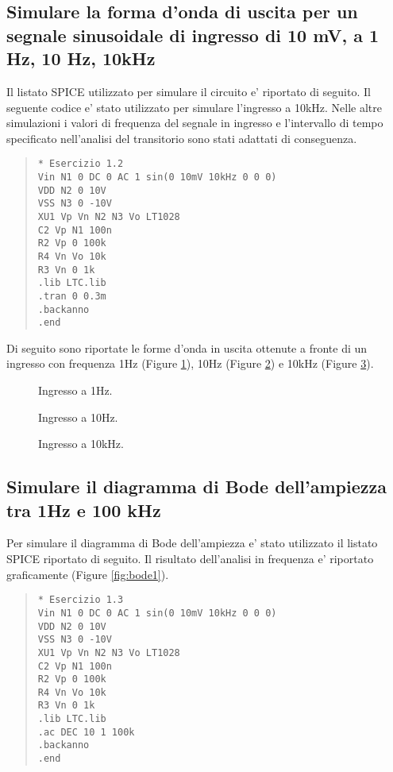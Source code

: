 \documentclass[a4paper,10pt]{article}
\begin{document}
\subsection{Simulare la forma d'onda di uscita per un segnale sinusoidale di ingresso di 10 mV, a 1 Hz, 10 Hz, 10kHz}
Il listato SPICE utilizzato per simulare il circuito e' riportato di seguito. Il seguente codice e' stato utilizzato per simulare l'ingresso a 10kHz. Nelle altre simulazioni i valori di frequenza del segnale in ingresso e l'intervallo di tempo specificato nell'analisi del transitorio sono stati adattati di conseguenza.
\begin{quote}
\begin{verbatim}
* Esercizio 1.2
Vin N1 0 DC 0 AC 1 sin(0 10mV 10kHz 0 0 0)
VDD N2 0 10V
VSS N3 0 -10V
XU1 Vp Vn N2 N3 Vo LT1028
C2 Vp N1 100n
R2 Vp 0 100k
R4 Vn Vo 10k
R3 Vn 0 1k
.lib LTC.lib
.tran 0 0.3m
.backanno
.end
\end{verbatim}
\end{quote}
Di seguito sono riportate le forme d'onda in uscita ottenute a fronte di un ingresso con frequenza 1Hz (Figure \ref{fig:plot1hz}), 10Hz (Figure \ref{fig:plot10hz}) e 10kHz (Figure \ref{fig:plot10khz}).

\begin{figure}[h!]
	\centering
  	\caption{Ingresso a 1Hz.}
  	\label{fig:plot1hz}
\end{figure}

\begin{figure}[h!]
	\centering
  	\caption{Ingresso a 10Hz.}
  	\label{fig:plot10hz}
\end{figure}

\begin{figure}[h!]
	\centering
  	\caption{Ingresso a 10kHz.}
  	\label{fig:plot10khz}
\end{figure}

\subsection{Simulare il diagramma di Bode dell'ampiezza tra 1Hz e 100 kHz}
Per simulare il diagramma di Bode dell'ampiezza e' stato utilizzato il listato SPICE riportato di seguito. Il risultato dell'analisi in frequenza e' riportato graficamente (Figure \ref{fig:bode1}).
\begin{quote}
\begin{verbatim}
* Esercizio 1.3
Vin N1 0 DC 0 AC 1 sin(0 10mV 10kHz 0 0 0)
VDD N2 0 10V
VSS N3 0 -10V
XU1 Vp Vn N2 N3 Vo LT1028
C2 Vp N1 100n
R2 Vp 0 100k
R4 Vn Vo 10k
R3 Vn 0 1k
.lib LTC.lib
.ac DEC 10 1 100k
.backanno
.end
\end{verbatim}
\end{quote}
\end{document}

